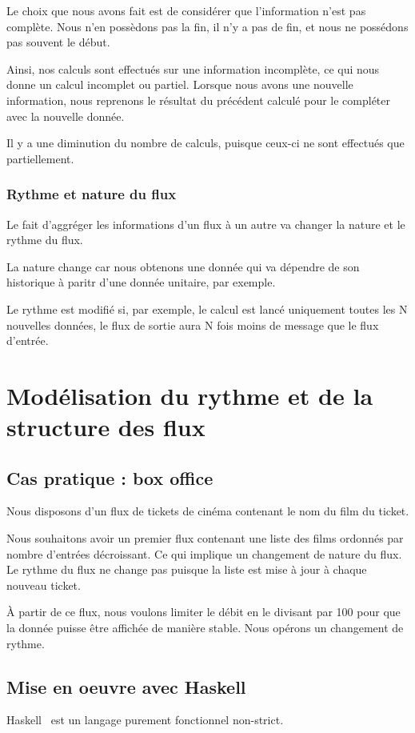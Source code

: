 \documentclass{llncs}
\begin{document}
Le choix que nous avons fait est de considérer que l'information n'est pas complète.
Nous n'en possèdons pas la fin, il n'y a pas de fin, et nous ne possédons pas
souvent le début.

Ainsi, nos calculs sont effectués sur une information incomplète, ce qui nous
donne un calcul incomplet ou partiel.
Lorsque nous avons une nouvelle information, nous reprenons le résultat du
précédent calculé pour le compléter avec la nouvelle donnée.

Il y a une diminution du nombre de calculs, puisque ceux-ci ne sont effectués
que partiellement.

\subsubsection{Rythme et nature du flux}
Le fait d'aggréger les informations d'un flux à un autre va changer la nature et
le rythme du flux.

La nature change car nous obtenons une donnée qui va dépendre de son historique
à paritr d'une donnée unitaire, par exemple.

Le rythme est modifié si, par exemple, le calcul est lancé uniquement toutes les
N nouvelles données, le flux de sortie aura N fois moins de message que le flux d'entrée.

\section{Modélisation du rythme et de la structure des flux}
\subsection{Cas pratique : box office}
Nous disposons d'un flux de tickets de cinéma contenant le nom du film du ticket.

Nous souhaitons avoir un premier flux contenant une liste des films ordonnés par
nombre d'entrées décroissant.
Ce qui implique un changement de nature du flux.
Le rythme du flux ne change pas puisque la liste est mise à jour à chaque nouveau
ticket.

À partir de ce flux, nous voulons limiter le débit en le divisant par 100 pour
que la donnée puisse être affichée de manière stable.
Nous opérons un changement de rythme.

\subsection{Mise en oeuvre avec Haskell}
Haskell~\cite{Haskell10} est un langage purement fonctionnel non-strict.
\end{document}
